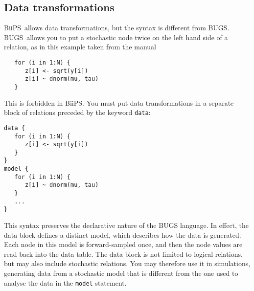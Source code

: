 \documentclass[11pt, a4paper, titlepage]{report}
\newcommand{\biips}{\textsf{BiiPS}}
\newcommand{\BUGS}{\textsf{BUGS}}
\begin{document}
% 
% 

\subsection{Data transformations}
\label{section:data:tranformations}

\biips\ allows data transformations, but the syntax is different from
\BUGS.  \BUGS\ allows you to put a stochastic node twice on the left
hand side of a relation, as in this example taken from the manual
\begin{verbatim}
   for (i in 1:N) {
      z[i] <- sqrt(y[i])
      z[i] ~ dnorm(mu, tau)
   }
\end{verbatim}
This is forbidden in \biips. You must put data transformations in a 
separate block of relations preceded by the keyword \texttt{data}:
\begin{verbatim}
data {
   for (i in 1:N) {
      z[i] <- sqrt(y[i])
   }
}
model {
   for (i in 1:N) {
      z[i] ~ dnorm(mu, tau)
   }
   ...
}
\end{verbatim}
This syntax preserves the declarative nature of the BUGS language.
In effect, the data block defines a distinct model, which describes
how the data is generated. Each node in this model is forward-sampled
once, and then the node values are read back into the data table. The
data block is not limited to logical relations, but may also include
stochastic relations. You may therefore use it in simulations,
generating data from a stochastic model that is different from the one
used to analyse the data in the \texttt{model} statement.
\end{document}
